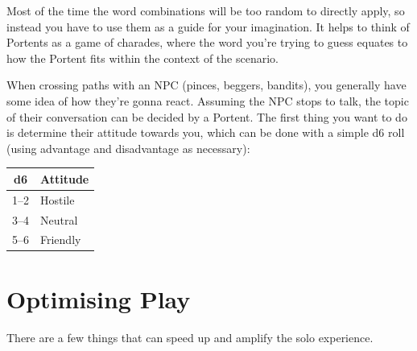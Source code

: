 \documentclass[12pt, letterpaper]{article}
\begin{document}
Most of the time the word combinations will be too random to directly apply, so instead you have to use them as a guide for your imagination. It helps to think of Portents as a game of charades, where the word you're trying to guess equates to how the Portent fits within the context of the scenario.

When crossing paths with an NPC (pinces, beggers, bandits), you generally have some idea of how they're gonna react. Assuming the NPC stops to talk, the topic of their conversation can be decided by a Portent. The first thing you want to do is determine their attitude towards you, which can be done with a simple d6 roll (using advantage and disadvantage as necessary):

\begin{center}
\begin{tabular}{|c|l|}
\hline
\textbf{d6} & \textbf{Attitude} \\
\hline
1--2 & Hostile \\
3--4 & Neutral \\
5--6 & Friendly \\
\hline
\end{tabular}
\end{center}

\section*{Optimising Play}

There are a few things that can speed up and amplify the solo experience.
\end{document}
